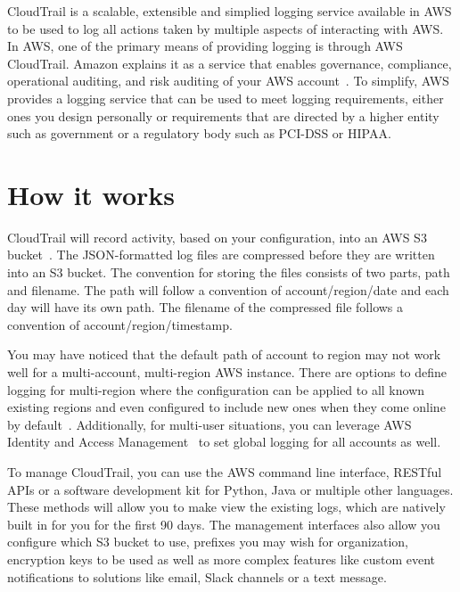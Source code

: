 CloudTrail is a scalable, extensible and simplied logging service available 
in AWS to be used to log all actions taken by multiple aspects of interacting
with AWS. In AWS, one of the primary means of providing logging is through AWS 
CloudTrail. Amazon explains it as a service that enables governance, 
compliance, operational auditing, and risk auditing of your AWS 
account~\cite{hid-sp18-518-CloudTrail-user-guide}. To simplify, AWS provides 
a logging service that can be used to meet logging requirements, either ones
you design personally or requirements that are directed by a higher entity 
such as government or a regulatory body such as PCI-DSS or HIPAA.

\section{How it works}

CloudTrail will record activity, based on your configuration, into an 
AWS S3 bucket~\cite{hid-sp18-518-CloudTrail-log-example}.
The JSON-formatted log files are compressed before they are written into an 
S3 bucket. The convention for storing the files consists of two 
parts, path and filename. The path will follow a convention of 
account/region/date and each day will have its own path.  The filename of the 
compressed file follows a convention of account/region/timestamp. 

You may have noticed that the default path of account to region may not work 
well for a multi-account, multi-region AWS instance. There are options to 
define logging for multi-region where the configuration can be applied to all 
known existing regions and even configured to include new ones when they come 
online by default~\cite{hid-sp18-518-CloudTrail-global-events}. Additionally, 
for multi-user situations, you can leverage AWS Identity and Access 
Management~\cite{hid-sp18-518-CloudTrail-IAM} to set global logging for all 
accounts as well.

To manage CloudTrail, you can use the AWS command line interface, RESTful APIs
or a software development kit for Python, Java or multiple other languages. 
These methods will allow you to make view the existing logs, which are natively 
built in for you for the first 90 days. The management interfaces also allow
you configure which S3 bucket to use, prefixes you may wish for organization, 
encryption keys to be used as well as more complex features like custom event
notifications to solutions like email, Slack channels or a text message.

